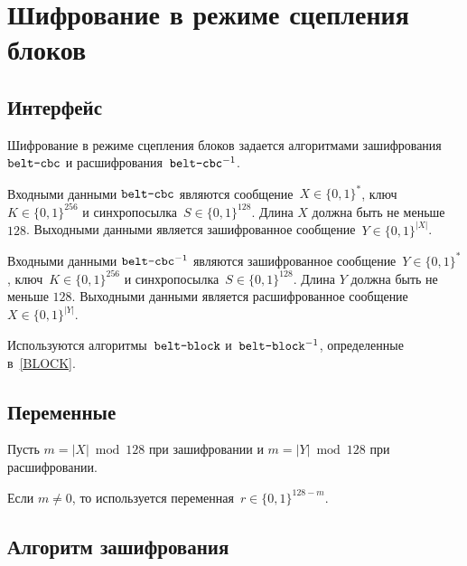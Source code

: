 \section{Шифрование в режиме сцепления блоков}\label{CBC}

\subsection{Интерфейс}\label{CBC.IFace}

Шифрование в режиме сцепления блоков задается алгоритмами 
зашифрования~$\texttt{belt-cbc}$ и расшифрования~$\texttt{belt-cbc}^{-1}$.

Входными данными $\texttt{belt-cbc}$ являются сообщение~$X\in\{0,1\}^*$, 
ключ~$K\in\{0,1\}^{256}$ и синхропосылка~$S\in\{0,1\}^{128}$. 
%
Длина $X$ должна быть не меньше $128$.
%
Выходными данными является зашифрованное сообщение~$Y\in\{0,1\}^{|X|}$.

Входными данными $\texttt{belt-cbc}^{-1}$ являются зашифрованное 
сообщение~$Y\in\{0,1\}^*$, ключ~$K\in\{0,1\}^{256}$ и 
синхропосылка~$S\in\{0,1\}^{128}$.  
%
Длина $Y$ должна быть не меньше $128$.
%
Выходными данными является расшифрованное сообщение~$X\in\{0,1\}^{|Y|}$.

Используются алгоритмы~$\texttt{belt-block}$ и~$\texttt{belt-block}^{-1}$, 
определенные в~\ref{BLOCK}.

\subsection{Переменные}

Пусть $m=|X|\bmod 128$ при зашифровании 
и $m=|Y|\bmod 128$ при расшифровании.

Если $m\neq 0$, то используется переменная~$r\in\{0,1\}^{128-m}$.

\subsection{Алгоритм зашифрования}

